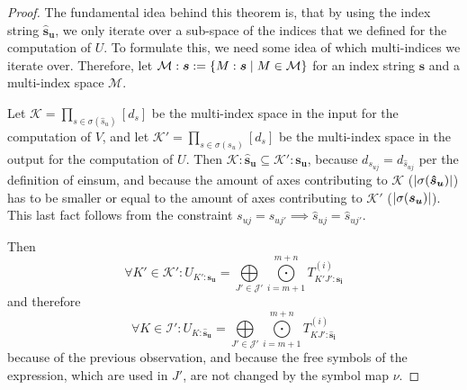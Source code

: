 \begin{proof}
    The fundamental idea behind this theorem is, that by using the index string $\bm{\hat{s}_u}$, we only iterate over a sub-space of the indices that we defined for the computation of $U$.
    To formulate this, we need some idea of which multi-indices we iterate over.
    Therefore, let $\mathcal{M}:\bm{s} := \lbrace M: \bm{s} \mid M \in \mathcal{M} \rbrace$ for an index string $\bm{s}$ and a multi-index space $\mathcal{M}$.

    Let $\mathcal{K} = \prod_{s \in \sigma(\hat{s}_u)} [d_s]$ be the multi-index space in the input for the computation of $V$,
    and let $\mathcal{K}' = \prod_{s \in \sigma(s_u)} [d_s]$ be the multi-index space in the output for the computation of $U$.
    Then $\mathcal{K}:\bm{\hat{s}_u} \subseteq \mathcal{K}':\bm{s_u}$, because $d_{s_{uj}} = d_{\hat{s}_{uj}}$ per the definition of einsum,
    and because the amount of axes contributing to $\mathcal{K}$ ($\left| \sigma(\bm{\hat{s}_u}) \right|$) has to be smaller or equal to the amount of axes contributing to $\mathcal{K}'$ ($\left| \sigma(\bm{s_u}) \right|$).
    This last fact follows from the constraint $s_{uj} = s_{uj'} \implies \hat{s}_{uj} = \hat{s}_{uj'}$.

    Then
    $$\forall K' \in \mathcal{K}': U_{K': \bm{s_u}} = \bigoplus\limits_{J' \in \mathcal{J}'}\bigodot\limits_{i = m + 1}^{m + n} T^{(i)}_{K'J':\bm{s_{i}}}$$
    and therefore
    $$\forall K \in \mathcal{I}': U_{K: \bm{\hat{s}_u}} = \bigoplus\limits_{J' \in \mathcal{J}'}\bigodot\limits_{i = m + 1}^{m + n} T^{(i)}_{KJ':\bm{\hat{s}_{i}}}$$
    because of the previous observation,
    and because the free symbols of the expression, which are used in $J'$, are not changed by the symbol map $\nu$.


\end{proof}
